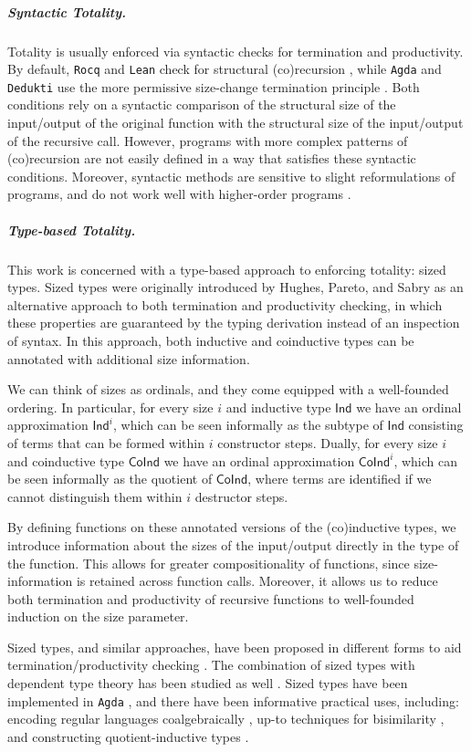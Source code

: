 \documentclass[10pt,a4paper]{article}
\theoremstyle{definition}
\theoremstyle{remark}
\renewcommand{\.}{.\,} %
\renewcommand{\:}{:} %
\newcommand{\0}{\mathbf{0}}
\newcommand{\1}{\mathbf{1}}
\newcommand\<\langle
\renewcommand\>\rangle
\renewcommand\sf\mathsf
\theoremstyle{remark}
\begin{document}
\subparagraph{Syntactic Totality.}
Totality is usually enforced via syntactic checks for termination and productivity.
By default, \texttt{Rocq} and \texttt{Lean} check for structural (co)recursion \cite{goguen_eliminating_2006,cockx_eliminating_2016,thibodeau_intensional_2020}, while \texttt{Agda} and \texttt{Dedukti} use the more permissive size-change termination principle \cite{size-change}.
Both conditions rely on a syntactic comparison of the structural size of the input/output of the original function with the structural size of the input/output of the recursive call. 
However, programs with more complex patterns of (co)recursion are not easily defined in a way that satisfies these syntactic conditions.
Moreover, syntactic methods are sensitive to slight reformulations of programs, and do not work well with higher-order programs \cite{Abel-inflationary}.

\subparagraph{Type-based Totality.}
This work is concerned with a type-based approach to enforcing totality: sized types.
Sized types were originally introduced by Hughes, Pareto, and Sabry \cite{hughes} as an alternative approach to both termination and productivity checking, in which these properties are guaranteed by the typing derivation instead of an inspection of syntax.
In this approach, both inductive and coinductive types can be annotated with additional size information.

We can think of sizes as ordinals, and they come equipped with a well-founded ordering.
In particular, for every size \(i\) and inductive type \(\sf{Ind}\) we have an ordinal approximation \(\sf{Ind}^i\), which can be seen informally as the subtype of \(\sf{Ind}\) consisting of terms that can be formed within \(i\) constructor steps.
Dually, for every size \(i\) and coinductive type \(\sf{CoInd}\) we have an ordinal approximation \(\sf{CoInd}^i\), which can be seen informally as the quotient of \(\sf{CoInd}\), where terms are identified if we cannot distinguish them within \(i\) destructor steps.

By defining functions on these annotated versions of the (co)inductive types, we introduce information about the sizes of the input/output directly in the type of the function.
This allows for greater compositionality of functions, since size-information is retained across function calls.
Moreover, it allows us to reduce both termination and productivity of recursive functions to well-founded induction on the size parameter.

Sized types, and similar approaches, have been proposed in different forms to aid  termination/productivity checking \cite{xi_sizes_2002, blanqui_sizes_2004, barthe_sizes_2004, Abel2006TypebasedTA, abel_2008}. 
The combination of sized types with dependent type theory has been studied as well \cite{Barthe, sacchini_2013, sacchini_2014, NbE, Chan_2022}.
Sized types have been implemented in \texttt{Agda} \cite{PAR-10:MiniAgda_Integrating_Sized_Dependent}, and there have been informative practical uses, including: encoding regular languages coalgebraically \cite{abel_2016}, up-to techniques for bisimilarity \cite{up-to-sized-types}, and constructing quotient-inductive types \cite{constructing-qits}.
\end{document}
